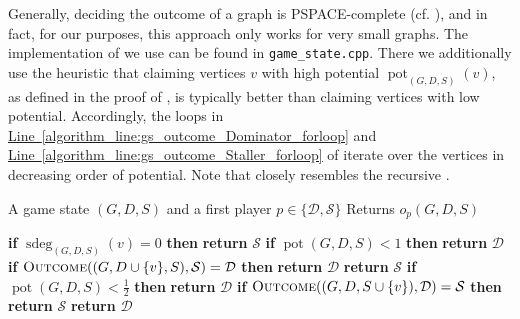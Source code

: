 \documentclass[a4paper,11pt,oneside]{scrartcl}
\theoremstyle{definition}
\theoremstyle{remark}
\DeclareMathOperator{\pot}{pot}
\DeclareMathOperator{\gsdeg}{sdeg}
\newcommand{\lineref}[1]{\hyperref[#1]{Line~\ref{#1}}}
\begin{document}
Generally, deciding the outcome of a graph is PSPACE-complete (cf. \cite{DGPR}), and in fact, for our purposes, this approach only works for very small graphs. The implementation of  we use can be found in \texttt{game\_state.cpp}. There we additionally use the heuristic that claiming vertices $v$ with high potential $\pot_{(G,D,S)}(v)$, as defined in the proof of , is typically better than claiming vertices with low potential. Accordingly, the loops in \lineref{algorithm_line:gs_outcome_Dominator_forloop} and \lineref{algorithm_line:gs_outcome_Staller_forloop} of  iterate over the vertices in decreasing order of potential. Note that  closely resembles the recursive .


\begin{algorithm}[ht]
    \caption{\textsc{Outcome}$((G,D,S),p)$}
    \label{algorithm:outcome_game_state}
    \begin{algorithmic}[1]
        \REQUIRE A game state $(G,D,S)$ and a first player $p \in \{\mathcal D, \mathcal S\}$
        \ENSURE Returns $o_p(G,D,S)$
    
            \STATE \textbf{if} $\gsdeg_{(G,D,S)}(v) = 0$ \textbf{then} \textbf{return} $\mathcal S$\label{algorithm_line:gs_outcome_Staller_already_won}
        \ENDFOR
            \STATE \textbf{if} $\pot(G,D,S) < 1$ \textbf{then} \textbf{return} $\mathcal D$\label{algorithm_line:gs_outcome_Dominator_potcheck}
             \label{algorithm_line:gs_outcome_Dominator_forloop}
                \STATE \textbf{if} $\textsc{Outcome}((G,D \cup \{v\}, S), \mathcal S) = \mathcal D$ \textbf{then} \textbf{return} $\mathcal D$\label{algorithm_line:gs_outcome_Dominator_inside_forloop}
            \ENDFOR
            \STATE \textbf{return} $\mathcal S$\label{algorithm_line:gs_outcome_Dominator_no_winning_vertex}
            \STATE \textbf{if} $\pot(G,D,S) < \tfrac{1}{2}$ \textbf{then} \textbf{return} $\mathcal D$\label{algorithm_line:gs_outcome_Staller_potcheck}
             \label{algorithm_line:gs_outcome_Staller_forloop}
                \STATE \textbf{if} $\textsc{Outcome}((G,D,S \cup \{v\}), \mathcal D) = \mathcal S$ \textbf{then} \textbf{return} $\mathcal S$\label{algorithm_line:gs_outcome_Staller_inside_forloop}
            \ENDFOR
            \STATE \textbf{return} $\mathcal D$
        \ENDIF
    \end{algorithmic}
\end{algorithm}
\end{document}
